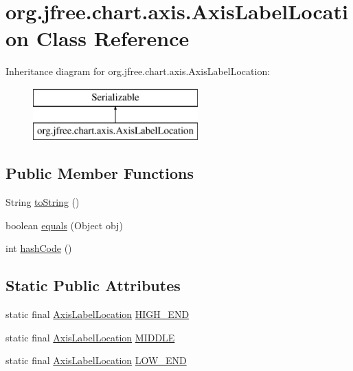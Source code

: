 \hypertarget{classorg_1_1jfree_1_1chart_1_1axis_1_1_axis_label_location}{}\section{org.\+jfree.\+chart.\+axis.\+Axis\+Label\+Location Class Reference}
\label{classorg_1_1jfree_1_1chart_1_1axis_1_1_axis_label_location}
Inheritance diagram for org.\+jfree.\+chart.\+axis.\+Axis\+Label\+Location\+:\begin{figure}[H]
\begin{center}
\leavevmode
\includegraphics[height=2.000000cm]{classorg_1_1jfree_1_1chart_1_1axis_1_1_axis_label_location}
\end{center}
\end{figure}
\subsection*{Public Member Functions}
\begin{DoxyCompactItemize}
\item 
String \mbox{\hyperlink{classorg_1_1jfree_1_1chart_1_1axis_1_1_axis_label_location_acd2002d564ece1369df40cde1d0e5778}{to\+String}} ()
\item 
boolean \mbox{\hyperlink{classorg_1_1jfree_1_1chart_1_1axis_1_1_axis_label_location_a33ab937d4be7d71a9453d20d8f0edacb}{equals}} (Object obj)
\item 
int \mbox{\hyperlink{classorg_1_1jfree_1_1chart_1_1axis_1_1_axis_label_location_a12a119a9ed3994c382c141ed8e3e70a9}{hash\+Code}} ()
\end{DoxyCompactItemize}
\subsection*{Static Public Attributes}
\begin{DoxyCompactItemize}
\item 
static final \mbox{\hyperlink{classorg_1_1jfree_1_1chart_1_1axis_1_1_axis_label_location}{Axis\+Label\+Location}} \mbox{\hyperlink{classorg_1_1jfree_1_1chart_1_1axis_1_1_axis_label_location_a3ef40c81a31dd48feac6b18de1c4441a}{H\+I\+G\+H\+\_\+\+E\+ND}}
\item 
static final \mbox{\hyperlink{classorg_1_1jfree_1_1chart_1_1axis_1_1_axis_label_location}{Axis\+Label\+Location}} \mbox{\hyperlink{classorg_1_1jfree_1_1chart_1_1axis_1_1_axis_label_location_aeb7faa19a7ce53da12faa53950eb8c75}{M\+I\+D\+D\+LE}}
\item 
static final \mbox{\hyperlink{classorg_1_1jfree_1_1chart_1_1axis_1_1_axis_label_location}{Axis\+Label\+Location}} \mbox{\hyperlink{classorg_1_1jfree_1_1chart_1_1axis_1_1_axis_label_location_a8eb51f5bd2922af1686651df7f516885}{L\+O\+W\+\_\+\+E\+ND}}
\end{DoxyCompactItemize}



